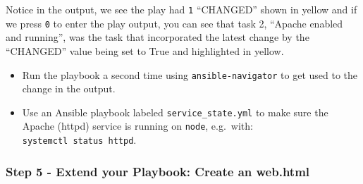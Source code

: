 Notice in the output, we see the play had \texttt{1} ``CHANGED'' shown
in yellow and if we press \texttt{0} to enter the play output, you can
see that task 2, ``Apache enabled and running'', was the task that
incorporated the latest change by the ``CHANGED'' value being set to
True and highlighted in yellow.

\begin{itemize}
\item
  Run the playbook a second time using \texttt{ansible-navigator} to get
  used to the change in the output.
\item
  Use an Ansible playbook labeled \texttt{service\_state.yml} to make sure the
  Apache (httpd) service is running on \texttt{node}, e.g.~with:
  \texttt{systemctl\ status\ httpd}.
\end{itemize}

\begin{Shaded}
\begin{Highlighting}[]
\PreprocessorTok{{-}{-}{-}}
\KeywordTok{{-}}\AttributeTok{ }\KeywordTok{:}
\AttributeTok{  }\KeywordTok{:}
\AttributeTok{  }\KeywordTok{:}\AttributeTok{ }
\AttributeTok{  }\KeywordTok{:}
\AttributeTok{    }\KeywordTok{:}
\AttributeTok{  }\KeywordTok{:}
\AttributeTok{    }\KeywordTok{{-}}\AttributeTok{ }\KeywordTok{:}
\AttributeTok{      }\KeywordTok{:}
\AttributeTok{      }\KeywordTok{:}
\AttributeTok{    }\KeywordTok{{-}}\AttributeTok{ }\KeywordTok{:}
\AttributeTok{        }\KeywordTok{:}
\end{Highlighting}
\end{Shaded}

\begin{Shaded}
\begin{Highlighting}[]
\ExtensionTok{[student@controller}\NormalTok{ \textasciitilde{}]$ ansible{-}navigator run service\_state.yml}
\end{Highlighting}
\end{Shaded}

\hypertarget{step-5---extend-your-playbook-create-an-web.html}{%
\subsubsection{Step 5 - Extend your Playbook: Create an
web.html}\label{step-5---extend-your-playbook-create-an-web.html}}

